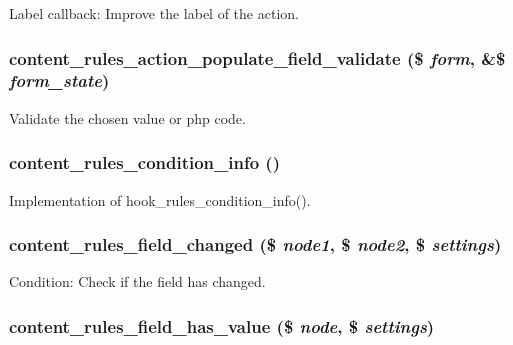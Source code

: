 Label callback: Improve the label of the action. \hypertarget{content_8rules_8inc_2e53cf864b6d710c7b3593abcd5caa92}{
\subsubsection[{content\_\-rules\_\-action\_\-populate\_\-field\_\-validate}]{\setlength{\rightskip}{0pt plus 5cm}content\_\-rules\_\-action\_\-populate\_\-field\_\-validate (\$ {\em form}, \/  \&\$ {\em form\_\-state})}}
\label{content_8rules_8inc_2e53cf864b6d710c7b3593abcd5caa92}


Validate the chosen value or php code. \hypertarget{content_8rules_8inc_59bc67309daeaf3bd2763232a3647d22}{
\subsubsection[{content\_\-rules\_\-condition\_\-info}]{\setlength{\rightskip}{0pt plus 5cm}content\_\-rules\_\-condition\_\-info ()}}
\label{content_8rules_8inc_59bc67309daeaf3bd2763232a3647d22}


Implementation of hook\_\-rules\_\-condition\_\-info(). \hypertarget{content_8rules_8inc_f20c9f43c6c5897cf3eaa4c6e46a06d9}{
\subsubsection[{content\_\-rules\_\-field\_\-changed}]{\setlength{\rightskip}{0pt plus 5cm}content\_\-rules\_\-field\_\-changed (\$ {\em node1}, \/  \$ {\em node2}, \/  \$ {\em settings})}}
\label{content_8rules_8inc_f20c9f43c6c5897cf3eaa4c6e46a06d9}


Condition: Check if the field has changed. \hypertarget{content_8rules_8inc_f053a4e6221e3533fcb4b5532ecb0279}{
\subsubsection[{content\_\-rules\_\-field\_\-has\_\-value}]{\setlength{\rightskip}{0pt plus 5cm}content\_\-rules\_\-field\_\-has\_\-value (\$ {\em node}, \/  \$ {\em settings})}}
\label{content_8rules_8inc_f053a4e6221e3533fcb4b5532ecb0279}


